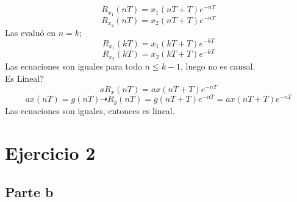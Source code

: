 \documentclass{report}
\begin{document}
$$R_{x_{1}}(nT) = x_1(nT+T)e^{-nT}$$
$$R_{x_{2}}(nT) = x_2(nT+T)e^{-nT}$$
Las evalu\'o en $n=k$;\\
$$R_{x_{1}}(kT) = x_1(kT+T)e^{-kT}$$
$$R_{x_{2}}(kT) = x_2(kT+T)e^{-kT}$$
Las ecuaciones son iguales para todo $n\leq k-1$, luego no es causal.\\
Es Lineal?\\
$$aR_x(nT) = ax(nT+T)e^{-nT}$$
$$ax(nT)=g(nT)\dashrightarrow R_g(nT) = g(nT+T)e^{-nT} = ax(nT+T)e^{-nT} $$
Las ecuaciones son iguales, entonces es lineal.\\

\chapter*{Ejercicio 2}

\section{Parte b}
\end{document}
